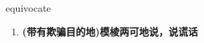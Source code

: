 
\begin{frame}
{\huge equivocate}
\begin{center}
\begin{enumerate}\Large
  \item \textbf{(带有欺骗目的地)模棱两可地说，说谎话}
\end{enumerate}
\end{center}
\end{frame}
